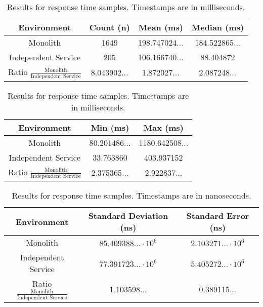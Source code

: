 \begin{table}[ht!]
    \begin{tabular}{|c c c c|} 
        \hline
        Environment
        & Count (n)
        & Mean (ms)
        & Median (ms)
        \\ [0.5ex] 
        
        \hline\hline
        Monolith
        & 1649
        & 198.747024...
        & 184.522865...
        \\ 
        
        Independent Service
        & 205
        & 106.166740...
        & 88.404872
        \\
        \hline
        Ratio $\frac{\text{Monolith}}{\text{Independent Service}}$
        & 8.043902...
        & 1.872027...
        & 2.087248...
        \\
        \hline
    \end{tabular}
    \caption{Results for response time samples. Timestamps are in milliseconds.}
    \label{table:response time results:1}
\end{table}

\begin{table}[ht!]
    \begin{tabular}{|c c c|} 
        \hline
        Environment
        & Min (ms)
        & Max (ms) \\ [0.5ex] 
        
        \hline\hline
        Monolith
        & 80.201486... 
        & 1180.642508...
        \\ 
        
        Independent Service
        & 33.763860
        & 403.937152
        \\
        \hline
        Ratio $\frac{\text{Monolith}}{\text{Independent Service}}$
        & 2.375365...
        & 2.922837...
        \\
        \hline
    \end{tabular}
    \caption{Results for response time samples. Timestamps are in milliseconds.}
    \label{table:response time results:2}
\end{table}

\begin{table}[ht!]
    \begin{tabular}{|c c c|} 
        \hline
        Environment
        & Standard Deviation (ns)
        & Standard Error (ns) \\ [0.5ex] 
        
        \hline\hline
        Monolith
        & $85.409388... \cdot 10^6$
        & $2.103271... \cdot 10^6$
        \\ 
        
        Independent Service
        & $77.391723... \cdot 10^6$
        & $5.405272... \cdot 10^6$
        \\ 
         \hline
        Ratio $\frac{\text{Monolith}}{\text{Independent Service}}$
        & 1.103598...
        & 0.389115...
        \\
        \hline
    \end{tabular}
    \caption{Results for response time samples. Timestamps are in nanoseconds.}
    \label{table:response time results:3}
\end{table}

